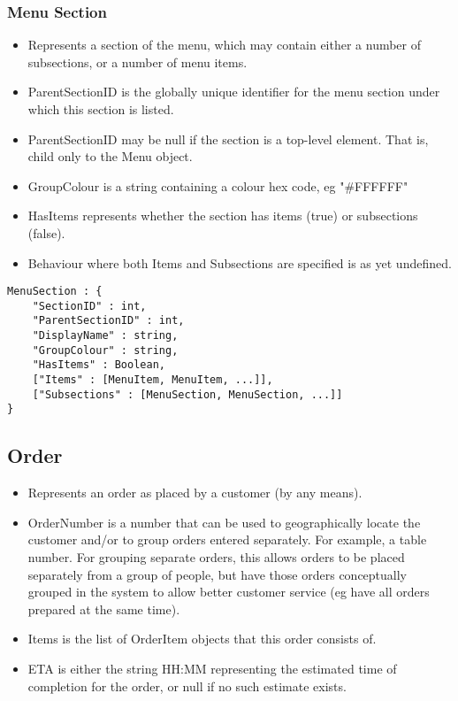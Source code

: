\documentclass[12pt, a4paper]{article}
\begin{document}
\subsubsection{Menu Section}\label{subsubsec:MenuSection}

\begin{itemize}
\item Represents a section of the menu, which may contain either a number of subsections, or a number of menu items.
\item ParentSectionID is the globally unique identifier for the menu section under which this section is listed.
\item ParentSectionID may be null if the section is a top-level element. That is, child only to the Menu object.
\item GroupColour is a string containing a colour hex code, eg "\#FFFFFF"
\item HasItems represents whether the section has items (true) or subsections (false).
\item Behaviour where both Items and Subsections are specified is as yet undefined. 
\end{itemize}

\begin{verbatim}
MenuSection : {
	"SectionID" : int,
	"ParentSectionID" : int,
	"DisplayName" : string,
	"GroupColour" : string,
	"HasItems" : Boolean,
	["Items" : [MenuItem, MenuItem, ...]],
	["Subsections" : [MenuSection, MenuSection, ...]]
}
\end{verbatim}


\pagebreak
\subsection{Order}\label{subsec:Order}

\begin{itemize}
\item Represents an order as placed by a customer (by any means).
\item OrderNumber is a number that can be used to geographically locate the customer and/or to group orders entered separately. For example, a table number.
For grouping separate orders, this allows orders to be placed separately from a group of people, but have those orders conceptually grouped in the system to allow better customer service (eg have all orders prepared at the same time).
\item Items is the list of OrderItem objects that this order consists of.
\item ETA is either the string HH:MM representing the estimated time of completion for the order, or null if no such estimate exists.
\end{itemize}
\end{document}
